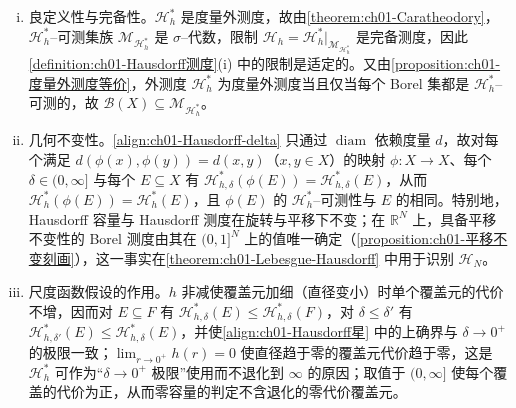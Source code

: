 \documentclass[../../main.tex]{subfiles}%
\begin{document}
\begin{remark}\label{remark:ch01-Hausdorff性质}
\begin{enumerate}[(i)]
\item 良定义性与完备性。$\mathcal{H}_h^*$ 是度量外测度，故由\cref{theorem:ch01-Caratheodory}，$\mathcal{H}_h^*$--可测集族 $\mathcal{M}_{\mathcal{H}_h^*}$ 是 $\sigma$--代数，限制 $\mathcal{H}_h=\mathcal{H}_h^*|_{\mathcal{M}_{\mathcal{H}_h^*}}$ 是完备测度，因此\cref{definition:ch01-Hausdorff测度}(i) 中的限制是适定的。又由\cref{proposition:ch01-度量外测度等价}，外测度 $\mathcal{H}_h^*$ 为度量外测度当且仅当每个 Borel 集都是 $\mathcal{H}_h^*$--可测的，故 $\mathcal{B}(X)\subseteq\mathcal{M}_{\mathcal{H}_h^*}$。
\item 几何不变性。\eqref{align:ch01-Hausdorff-delta} 只通过 $\operatorname{diam}$ 依赖度量 $d$，故对每个满足 $d(\phi(x),\phi(y))=d(x,y)$（$x,y\in X$）的映射 $\phi:X\to X$、每个 $\delta\in(0,\infty]$ 与每个 $E\subseteq X$ 有 $\mathcal{H}_{h,\delta}^*(\phi(E))=\mathcal{H}_{h,\delta}^*(E)$，从而 $\mathcal{H}_h^*(\phi(E))=\mathcal{H}_h^*(E)$，且 $\phi(E)$ 的 $\mathcal{H}_h^*$--可测性与 $E$ 的相同。特别地，Hausdorff 容量与 Hausdorff 测度在旋转与平移下不变；在 $\mathbb{R}^N$ 上，具备平移不变性的 Borel 测度由其在 $(0,1]^N$ 上的值唯一确定（\cref{proposition:ch01-平移不变刻画}），这一事实在\cref{theorem:ch01-Lebesgue-Hausdorff} 中用于识别 $\mathcal{H}_N$。
\item 尺度函数假设的作用。$h$ 非减使覆盖元加细（直径变小）时单个覆盖元的代价不增，因而对 $E\subseteq F$ 有 $\mathcal{H}_{h,\delta}^*(E)\leqslant\mathcal{H}_{h,\delta}^*(F)$，对 $\delta\leqslant\delta'$ 有 $\mathcal{H}_{h,\delta'}^*(E)\leqslant\mathcal{H}_{h,\delta}^*(E)$，并使\eqref{align:ch01-Hausdorff星} 中的上确界与 $\delta\to0^+$ 的极限一致；$\lim_{r\to0^+}h(r)=0$ 使直径趋于零的覆盖元代价趋于零，这是 $\mathcal{H}_h^*$ 可作为“$\delta\to0^+$ 极限”使用而不退化到 $\infty$ 的原因；取值于 $(0,\infty]$ 使每个覆盖的代价为正，从而零容量的判定不含退化的零代价覆盖元。

\end{enumerate}
\end{remark}
\end{document}
